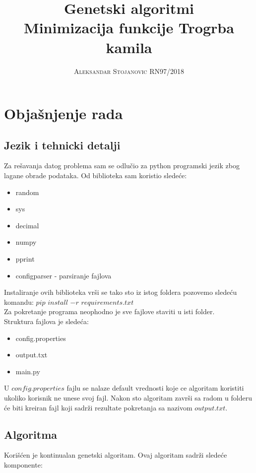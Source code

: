 \documentclass[a4paper,11pt]{book}
\title{\Huge \textbf{Genetski algoritmi} \\ \huge Minimizacija funkcije Trogrba kamila \\ }
\author{\textsc{Aleksandar Stojanovic RN97/2018}}
\begin{document}
\frontmatter
\maketitle

\mainmatter

\chapter{Objašnjenje rada}

\section{Jezik i tehnicki detalji}
Za rešavanja datog problema sam se odlučio za python programski jezik zbog lagane obrade podataka. Od biblioteka sam koristio sledeće:

\begin{itemize}
  \item random
  \item sys
  \item decimal
  \item numpy
  \item pprint
  \item configparser - parsiranje fajlova
\end{itemize}

Instaliranje ovih biblioteka vrši se tako sto iz istog foldera pozovemo sledeću komandu: $pip$ $install$ $-r$ $requirements.txt$ \\
Za pokretanje programa neophodno je sve fajlove staviti u isti folder.\\

Struktura fajlova je sledeća:
\begin{itemize}
  \item config.properties
  \item output.txt
  \item main.py
\end{itemize}

U $config.properties$ fajlu se nalaze default vrednosti koje ce algoritam koristiti ukoliko korisnik ne unese svoj fajl. Nakon sto algoritam završi sa radom u folderu će biti kreiran fajl koji sadrži rezultate pokretanja sa nazivom $output.txt$.

\section{Algoritma}
Korišćen je kontinualan genetski algoritam. Ovaj algoritam sadrži sledeće komponente:
\end{document}
